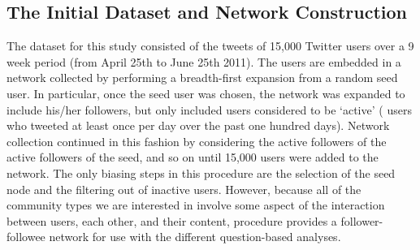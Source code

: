 \subsection{The Initial Dataset and Network Construction}

The dataset for this study consisted of the tweets of 15,000 Twitter users over a 9 week period (from April 25th to June 25th 2011). The users are embedded in a network collected by performing a breadth-first expansion from a random seed user. In particular, once the seed user was chosen, the network was expanded to include his/her followers, but only included users considered to be `active' ( \DIFaddend users who tweeted at least once per day over the past one hundred days). Network collection continued in this fashion by considering the active followers of the active followers of the seed, and so on until 15,000 users were added to the network. The only biasing steps in this procedure are the selection of the seed node and the filtering out of inactive users. However, because all of the community types we are interested in involve some aspect of the interaction between users, each other, and their content, \DIFdelbegin {}\DIFdelend \DIFaddbegin {}\DIFaddend procedure provides a \DIFdelbegin {}\DIFdelend \DIFaddbegin {}\DIFaddend follower-followee network for use with the different question-based analyses.

